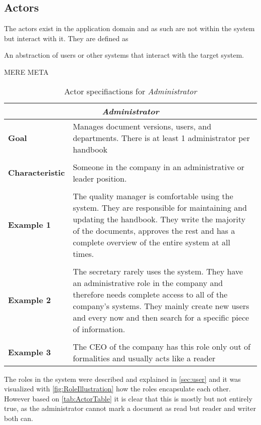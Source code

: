 \subsection{Actors}\label{sec:Actors}
The actors exist in the application domain and as such are not within the system but interact with it. They are defined as
\begin{defn}
An abstraction of users or other systems that interact with the target system. \citep[p.~121]{Rod-Aalborg}
\end{defn}

MERE META

\begin{table}[H]
	\begin{tabular}{l m{11.3cm}}
		\hline
		\multicolumn{2}{c}{\textbf{\textit{Administrator}}}\\
		\hline
		\textbf{Goal} &  Manages document versions, users, and departments. There is at least 1 administrator per handbook\\
		 &  \\
		\textbf{Characteristic} & Someone in the company in an administrative or leader position.\\
		&  \\
		\textbf{Example 1}
		& The quality manager is comfortable using the system. 
		They are responsible for maintaining and updating the handbook.
		They write the majority of the documents, approves the rest and has a complete overview of the entire system at all times. \\
		&  \\
		\textbf{Example 2}
		& The secretary rarely uses the system.
		They have an administrative role in the company and therefore needs complete access to all of the company's systems.
		They mainly create new users and every now and then search for a specific piece of information.\\
		&  \\
		\textbf{Example 3}
		& The CEO of the company has this role only out of formalities and usually acts like a reader\\
		\hline
	\end{tabular}
\caption{Actor specifiactions for \textit{Administrator}}\label{tab:Actor-admin}
\end{table}

The roles in the system were described and explained in \cref{sec:user} and it was visualized with \cref{fig:RoleIllustration} how the roles encapsulate each other.
However based on \cref{tab:ActorTable} it is clear that this is mostly but not entirely true, as the administrator cannot mark a document as read but reader and writer both can.

